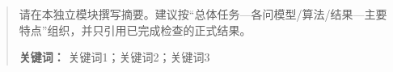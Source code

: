 \begin{abstract}
请在本独立模块撰写摘要。建议按“总体任务—各问模型/算法/结果—主要特点”组织，并只引用已完成检查的正式结果。

\textbf{关键词：} 关键词1；关键词2；关键词3
\end{abstract}
